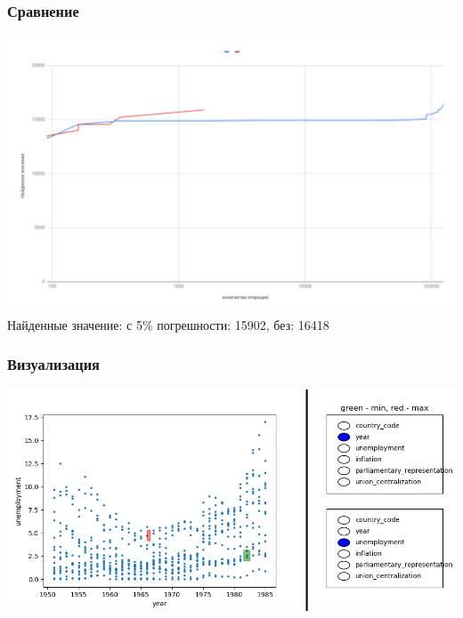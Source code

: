 \documentclass{beamer}
\begin{document}
\begin{frame}
\frametitle{Сравнение}
    \includegraphics[width=\textwidth]{graph.png}
    Найденные значение: с 5\% погрешности: 15902, без:  16418
\end{frame}

\begin{frame}
\frametitle{Визуализация}
    \includegraphics[width=\textwidth]{visual.png}
\end{frame}
\end{document}
